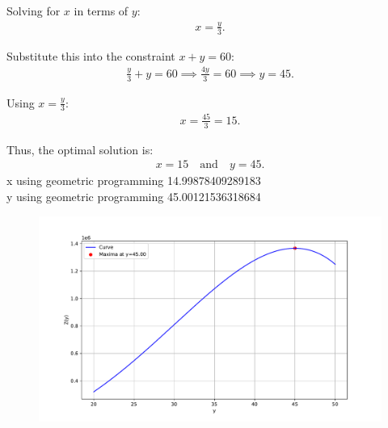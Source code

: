 \documentclass[journal,12pt,onecolumn]{IEEEtran}
\theoremstyle{remark}
\begin{document}
Solving for $x$ in terms of $y$:
\begin{align}
    x = \frac{y}{3}.
\end{align}

Substitute this into the constraint $x + y = 60$:
\begin{align}
    \frac{y}{3} + y = 60 \implies \frac{4y}{3} = 60 \implies y = 45.
\end{align}

Using $x = \frac{y}{3}$:
\begin{align}
    x = \frac{45}{3} = 15.
\end{align}

Thus, the optimal solution is:
\begin{align}
    x = 15 \quad \text{and} \quad y = 45.
\end{align}
x using geometric programming 14.99878409289183\\
y using geometric programming 45.00121536318684

\begin{figure}[h]
	\centering
	\includegraphics[width=\columnwidth]{figs/fig.pdf}
\end{figure}
\end{document}
